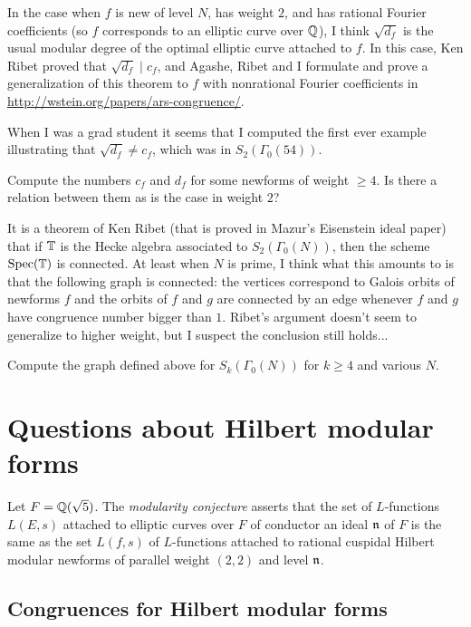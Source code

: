 \documentclass{article}
\begin{document}
In the case when $f$ is new of level $N$, has weight $2$, and has
rational Fourier coefficients (so $f$ corresponds to an elliptic curve
over $\mathbb{Q}$), I think $\sqrt{d_f}$ is the usual modular degree of the
optimal elliptic curve attached to $f$.  In this case, Ken Ribet
proved that $\sqrt{d_f} \mid c_f$, and Agashe, Ribet and I formulate
and prove a generalization of this theorem to $f$ with nonrational
Fourier coefficients in
\url{http://wstein.org/papers/ars-congruence/}.

When I was a grad student it seems that I computed the first ever
example illustrating that $\sqrt{d_f} \neq c_f$, which was in
$S_2(\Gamma_0(54))$. 


\vspace{1em}
 Compute the numbers $c_f$ and $d_f$ for
some newforms of weight $\geq 4$.  Is there a relation between
them as is the case in weight $2$?  
\vspace{1em}


It is a theorem of Ken Ribet (that is proved in Mazur's Eisenstein
ideal paper) that if $\mathbb{T}$ is the Hecke algebra associated to
$S_2(\Gamma_0(N))$, then the scheme $\operatorname{Spec}(\mathbb{T})$ is connected.  At
least when $N$ is prime, I think what this amounts to is that the
following graph is connected: the vertices correspond to Galois orbits
of newforms $f$ and the orbits of $f$ and $g$ are connected by
an edge whenever $f$ and $g$ have congruence number bigger than $1$.
Ribet's argument doesn't seem to generalize to higher weight, but I
suspect the conclusion still holds...

\vspace{1em}
 Compute the graph defined above for
$S_k(\Gamma_0(N))$ for $k\geq 4$ and various $N$.
\vspace{1em}


\section{Questions about Hilbert modular forms}

Let $F=\mathbb{Q}(\sqrt{5})$.  The {\em modularity conjecture} asserts that
the set of $L$-functions $L(E,s)$ attached to elliptic curves over $F$
of conductor an ideal $\mathfrak{n}$ of $F$ is the same as the set $L(f,s)$ of
$L$-functions attached to rational cuspidal Hilbert modular newforms of
parallel weight $(2,2)$ and level $\mathfrak{n}$.



\subsection{Congruences for Hilbert modular forms}
\end{document}
